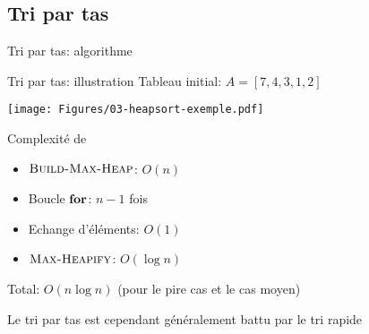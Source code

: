 
\subsection{Tri par tas}

\begin{frame}{Tri par tas: algorithme}

\begin{center}
\end{center}

\end{frame}

\begin{frame}{Tri par tas: illustration}
Tableau initial: $A=[7,4,3,1,2]$

\bigskip

\centerline{\texttt{[image: Figures/03-heapsort-exemple.pdf]}}

\end{frame}

\begin{frame}{Complexité de }
\begin{center}\small
{}
\end{center}

\begin{itemize}
\item $\textnormal{\scshape Build-Max-Heap}$: $O(n)$
\item Boucle $\textbf{for}$: $n-1$ fois
\item Echange d'éléments: $O(1)$
\item $\textnormal{\scshape Max-Heapify}$: $O(\log n)$
\end{itemize}
Total: $O(n\log n)$ \alert{(pour le pire cas et le cas moyen)}

\bigskip

Le tri par tas est cependant généralement battu par le tri rapide
\end{frame}

